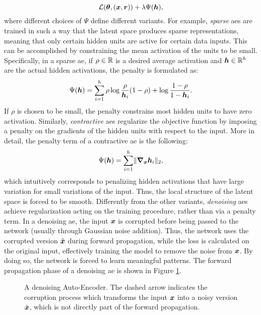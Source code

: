 $$\Loss(\Param, (\Vector{x}, \Vector{r})) + \lambda \Psi(\Vector{h}),$$
where different choices of $\Psi$ define different variants. For example, \emph{sparse} \glspl{ae}
are trained in such a way that the latent space produces sparse representations, meaning that only certain hidden units are active for certain data inputs. This can be accomplished by constraining the mean activation of the units to be small. Specifically, in a sparse \gls{ae}, if $\rho \in \mathbb{R}$ is a desired average activation and $\Vector{h} \in \Real^h$ are the actual hidden activations, the penalty is formulated as:
$$\Psi(\Vector{h}) = \sum_{i=1}^h \rho \log \frac{\rho}{\Vector{h}_i} (1 - \rho) + \log \frac{1-\rho}{1-\Vector{h}_i}.$$
If $\rho$ is chosen to be small, the penalty constrains most hidden units to have zero activation. Similarly, \emph{contractive} \glspl{ae} \citep{rifai2011contractiveautoenc} regularize the objective function by imposing a penalty on the gradients of the hidden units with respect to the input. More in detail, the penalty term of a contractive \gls{ae} is the following:
$$\Psi(\Vector{h}) = \sum_{i=1}^h\norm{\grad_{\Vector{x}}\Vector{h}_i}_2,$$
which intuitively corresponds to penalizing hidden activations that have large variation for small variations of the input. Thus, the local structure of the latent space is forced to be smooth. Differently from the other variants, \emph{denoising} \glspl{ae} \citep{vincent2010denoisingautoenc} achieve regularization acting on the training procedure, rather than via a penalty term. In a denoising \gls{ae}, the input $\Vector{x}$ is corrupted before being passed to the network (usually through Gaussian noise addition). Thus, the network uses the corrupted version $\tilde{\Vector{x}}$ during forward propagation, while the loss is calculated on the original input, effectively training the model to remove the noise from $\Vector{x}$. By doing so, the network is forced to learn meaningful patterns. The forward propagation phase of a denoising \gls{ae} is shown in Figure \ref{fig:denoising-ae}.
\begin{figure*}[h!]
    \centering
    \resizebox{.6\textwidth}{!}{}
    \caption{A denoising Auto-Encoder. The dashed arrow indicates the corruption process which transforms the input $\Vector{x}$ into a noisy version $\tilde{\Vector{x}}$, which is not directly part of the forward propagation.}
    \label{fig:denoising-ae}
\end{figure*}

